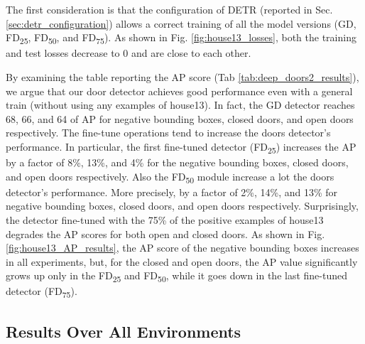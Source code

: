 \newpage

The first consideration is that the configuration of DETR (reported in Sec. \ref{sec:detr_configuration}) allows  a correct training of all the model versions (\textsf{GD}, \textsf{FD\textsubscript{25}}, \textsf{FD\textsubscript{50}}, and \textsf{FD\textsubscript{75}}). As shown in Fig. \ref{fig:house13_losses}, both the training and test losses decrease to 0 and are close to each other. 

By examining the table reporting the AP score (Tab \ref{tab:deep_doors2_results}), we argue that our door detector achieves good performance even with a general train (without using any examples of {house13}). In fact, the \textsf{GD} detector reaches 68, 66, and 64 of AP for negative bounding boxes, closed doors, and open doors respectively. The fine-tune operations tend to increase the doors detector's performance. In particular, the first fine-tuned detector (\textsf{FD\textsubscript{25}}) increases the AP by a factor of 8\%, 13\%, and 4\% for the negative bounding boxes, closed doors, and open doors respectively. Also the \textsf{FD\textsubscript{50}} module increase a lot the doors detector's performance. More precisely, by a factor of 2\%, 14\%, and 13\% for negative bounding boxes, closed doors, and open doors respectively. Surprisingly, the detector fine-tuned with the 75\% of the positive examples of \textsf{house13} degrades the AP scores for both open and closed doors. As shown in Fig. \ref{fig:house13_AP_results}, the AP score of the negative bounding boxes increases in all experiments, but, for the closed and open doors, the AP value significantly grows up only in the \textsf{FD\textsubscript{25}} and \textsf{FD\textsubscript{50}}, while it goes down in the last fine-tuned detector (\textsf{FD\textsubscript{75}}).

\subsection{Results Over All Environments}

